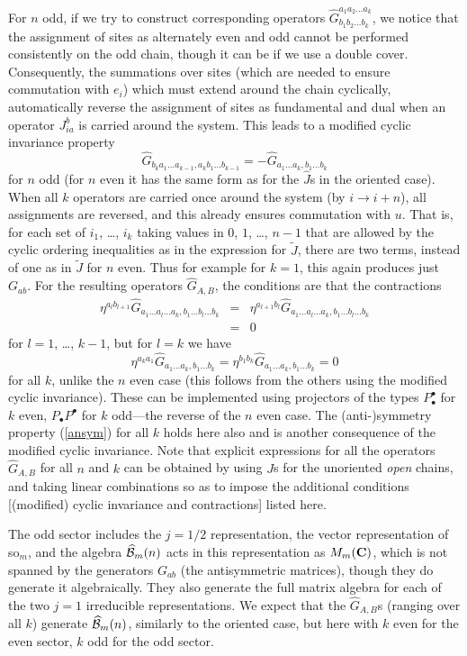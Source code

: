 \documentclass[twocolumn,floats,pra]{revtex4}
\newcommand {\be}{\begin{equation}}
\newcommand {\ee} {\end{equation}}
\newcommand {\bea}{\begin{eqnarray}}
\newcommand {\eea} {\end{eqnarray}}
\begin{document}
For $n$ odd, if we try to construct corresponding operators
$\widehat{G}^{a_1a_2\ldots a_k}_{b_1b_2\ldots b_k}$, we notice
that the assignment of sites as alternately even and odd cannot be
performed consistently on the odd chain, though it can be if we
use a double cover. Consequently, the summations over sites (which
are needed to ensure commutation with $e_i$) which must extend
around the chain cyclically, automatically reverse the assignment
of sites as fundamental and dual when an operator $J_{ia}^b$ is
carried around the system. This leads to a modified cyclic
invariance property
\be%
\widehat{G}_{b_ka_1\ldots a_{k-1},a_kb_1\ldots b_{k-1}}
=-\widehat{G}_{a_1\ldots a_k,b_1\ldots b_k}\ee%
for $n$ odd (for $n$ even it has the same form as for the
$\widehat{J}$s in the oriented case). When all $k$ operators are
carried once around the system (by $i\to i+n$), all assignments
are reversed, and this already ensures commutation with $u$. That
is, for each set of $i_1$, \ldots, $i_k$ taking values in $0$,
$1$, \ldots, $n-1$ that are allowed by the cyclic ordering
inequalities as in the expression for $\widetilde{J}$, there are
two terms, instead of one as in $\widetilde{J}$ for $n$ even. Thus
for example for $k=1$, this again produces just $G_{ab}$. For the
resulting operators $\widehat{G}_{A,B}$, the conditions are that
the contractions%
\bea%
\eta^{a_lb_{l+1}}\widehat{G}_{a_1\ldots a_l\ldots a_k,b_1\ldots
b_l\ldots b_k}&=&\eta^{a_{l+1}b_l}\widehat{G}_{a_1\ldots a_l\ldots
a_k,b_1\ldots b_l\ldots b_k}\nonumber\\
&=&0\eea%
for $l=1$, \ldots, $k-1$, but for $l=k$ we have%
\be%
\eta^{a_ka_1}\widehat{G}_{a_1\ldots a_k,b_1\ldots
b_k}=\eta^{b_1b_k}\widehat{G}_{a_1\ldots
a_k,b_1\ldots b_k}=0\ee%
for all $k$, unlike the $n$ even case (this follows from the
others using the modified cyclic invariance). These can be
implemented using projectors of the types $P_\bullet^\bullet$ for
$k$ even, $P_\bullet P^\bullet$ for $k$ odd---the reverse of the
$n$ even case. The (anti-)symmetry property (\ref{ansym}) for all
$k$ holds here also and is another consequence of the modified
cyclic invariance. Note that explicit expressions for all the
operators $\widehat{G}_{A,B}$ for all $n$ and $k$ can be obtained
by using $J$s for the unoriented {\em open} chains, and taking
linear combinations so as to impose the additional conditions
[(modified) cyclic invariance and contractions] listed here.


The odd sector includes the $j=1/2$ representation, the vector
representation of so$_m$, and the algebra $\widehat{\cal B}_m(n)$
acts in this representation as $M_m({\bf C})$, which is not
spanned by the generators $G_{ab}$ (the antisymmetric matrices),
though they do generate it algebraically. They also generate the
full matrix algebra for each of the two $j=1$ irreducible
representations. We expect that the $\widehat{G}_{A,B}$s (ranging
over all $k$) generate $\widehat{\cal B}_m(n)$, similarly to the
oriented case, but here with $k$ even for the even sector, $k$ odd
for the odd sector.
\end{document}
